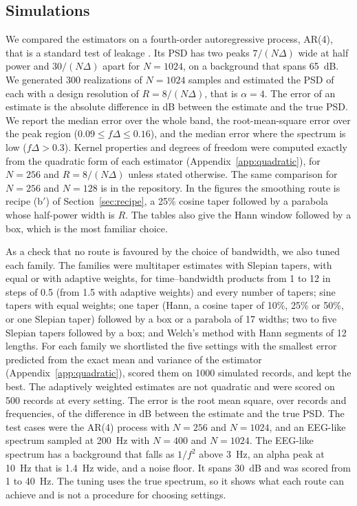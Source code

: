 \documentclass[10pt,twocolumn]{article}
\begin{document}
\subsection{Simulations}
\label{sec:simulations}
We compared the estimators on a fourth-order autoregressive process, AR(4), that is a standard test of leakage \cite{percival1993}. Its PSD has two peaks $7/(N\Delta)$ wide at half power and $30/(N\Delta)$ apart for $N=1024$, on a background that spans 65~dB. We generated 300 realizations of $N=1024$ samples and estimated the PSD of each with a design resolution of $R=8/(N\Delta)$, that is $\alpha=4$. The error of an estimate is the absolute difference in dB between the estimate and the true PSD. We report the median error over the whole band, the root-mean-square error over the peak region ($0.09\le f\Delta\le0.16$), and the median error where the spectrum is low ($f\Delta>0.3$). Kernel properties and degrees of freedom were computed exactly from the quadratic form of each estimator (Appendix~\ref{app:quadratic}), for $N=256$ and $R=8/(N\Delta)$ unless stated otherwise. The same comparison for $N=256$ and $N=128$ is in the repository. In the figures the smoothing route is recipe (b$'$) of Section~\ref{sec:recipe}, a 25\% cosine taper followed by a parabola whose half-power width is $R$. The tables also give the Hann window followed by a box, which is the most familiar choice.

As a check that no route is favoured by the choice of bandwidth, we also tuned each family. The families were multitaper estimates with Slepian tapers, with equal or with adaptive weights, for time--bandwidth products from 1 to 12 in steps of 0.5 (from 1.5 with adaptive weights) and every number of tapers; sine tapers \cite{riedel1995} with equal weights; one taper (Hann, a cosine taper of 10\%, 25\% or 50\%, or one Slepian taper) followed by a box or a parabola of 17 widths; two to five Slepian tapers followed by a box; and Welch's method with Hann segments of 12 lengths. For each family we shortlisted the five settings with the smallest error predicted from the exact mean and variance of the estimator (Appendix~\ref{app:quadratic}), scored them on 1000 simulated records, and kept the best. The adaptively weighted estimates are not quadratic and were scored on 500 records at every setting. The error is the root mean square, over records and frequencies, of the difference in dB between the estimate and the true PSD. The test cases were the AR(4) process with $N=256$ and $N=1024$, and an EEG-like spectrum sampled at 200~Hz with $N=400$ and $N=1024$. The EEG-like spectrum has a background that falls as $1/f^2$ above 3~Hz, an alpha peak at 10~Hz that is 1.4~Hz wide, and a noise floor. It spans 30~dB and was scored from 1 to 40~Hz. The tuning uses the true spectrum, so it shows what each route can achieve and is not a procedure for choosing settings.
\end{document}
